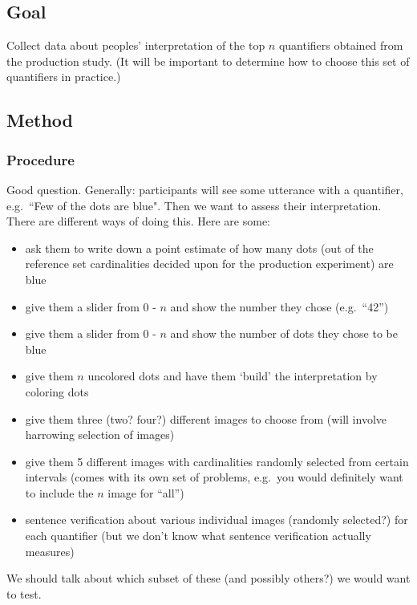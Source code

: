 \documentclass{article}
\begin{document}
\subsection{Goal}

Collect data about peoples' interpretation of the top $n$ quantifiers obtained from the production study. (It will be important to determine how to choose this set of quantifiers in practice.)

\subsection{Method}

\subsubsection{Procedure}

Good question. Generally: participants will see some utterance with a quantifier, e.g.~``Few of the dots are blue". Then we want to assess their interpretation. There are different ways of doing this. Here are some:

\begin{itemize}
	\item ask them to write down a point estimate of how many dots (out of the reference set cardinalities decided upon for the production experiment) are blue
	\item give them a slider from 0 - $n$ and show the number they chose (e.g.~``42'')
	\item give them a slider from 0 - $n$ and show the number of dots they chose to be blue
	\item give them $n$ uncolored dots and have them `build' the interpretation by coloring dots
	\item give them three (two? four?) different images to choose from (will involve harrowing selection of images)
	\item give them 5 different images with cardinalities randomly selected from certain intervals (comes with its own set of problems, e.g.~you would definitely want to include the $n$ image for ``all'')
	\item sentence verification about various individual images (randomly selected?) for each quantifier (but we don't know what sentence verification actually measures)
\end{itemize}

We should talk about which subset of these (and possibly others?) we would want to test.
\end{document}
